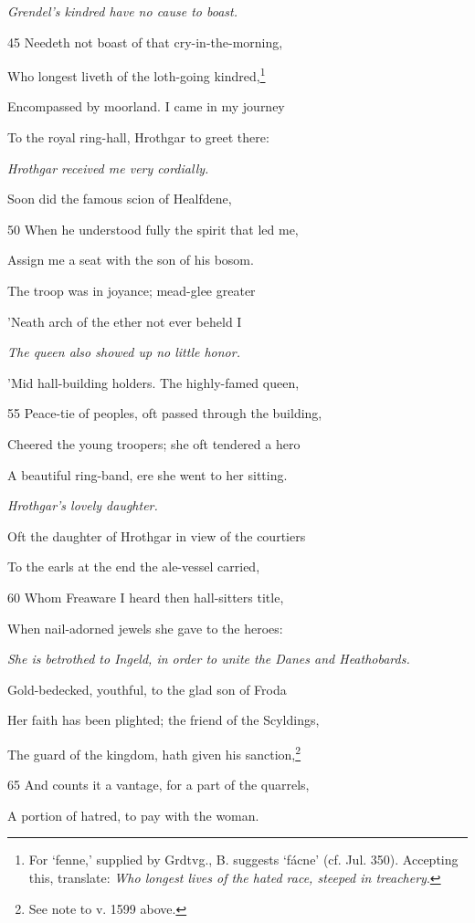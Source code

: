 \emph{Grendel’s kindred
have no cause to
boast.}

45
Needeth not boast of that cry-in-the-morning,

Who longest liveth of the loth-going kindred,\footnote{For ‘fenne,’ supplied by Grdtvg., B. suggests ‘fácne’ (cf. Jul. 350).
Accepting this, translate: \emph{Who longest lives of the hated race, steeped in
treachery}.}

Encompassed by moorland. I came in my journey

To the royal ring-hall, Hrothgar to greet there:

\emph{Hrothgar received
me very cordially.}

Soon did the famous scion of Healfdene,

50
When he understood fully the spirit that led me,

Assign me a seat with the son of his bosom.

The troop was in joyance; mead-glee greater

’Neath arch of the ether not ever beheld I

\emph{The queen also
showed up no little
honor.}

’Mid hall-building holders. The highly-famed queen,

55
Peace-tie of peoples, oft passed through the building,

Cheered the young troopers; she oft tendered a hero

A beautiful ring-band, ere she went to her sitting.

\emph{Hrothgar’s lovely
daughter.}

Oft the daughter of Hrothgar in view of the courtiers

To the earls at the end the ale-vessel carried,

60
Whom Freaware I heard then hall-sitters title,

When nail-adorned jewels she gave to the heroes:

\emph{She is betrothed to
Ingeld, in order to
unite the Danes
and Heathobards.}

Gold-bedecked, youthful, to the glad son of Froda

Her faith has been plighted; the friend of the Scyldings,

The guard of the kingdom, hath given his sanction,\footnote{See note to v. 1599 above.}

65
And counts it a vantage, for a part of the quarrels,

A portion of hatred, to pay with the woman.

